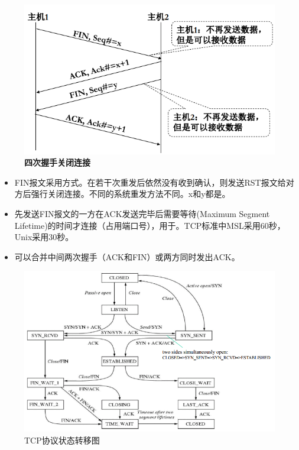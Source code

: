 \myhline
\begin{figure}[H]
    \centering
    \includegraphics[width=0.6\linewidth]{fig/tcp_close.png}
    \caption*{\textbf{四次握手关闭连接}}
\end{figure}
\begin{itemize}
    \item FIN报文采用方式。在若干次重发后依然没有收到确认，则发送RST报文给对方后强行关闭连接。不同的系统重发方法不同。x和y都是。
    \item 先发送FIN报文的一方在ACK发送完毕后需要等待(Maximum Segment Lifetime)的时间才连接（占用端口号），用于。TCP标准中MSL采用60秒，Unix采用30秒。
    \item 可以合并中间两次握手（ACK和FIN）或两方同时发出ACK。
\end{itemize}

\myhline
\begin{figure}[H]
    \centering
    \includegraphics[width=0.8\linewidth]{fig/TCP-transition.PNG}
    \caption*{TCP协议状态转移图}
\end{figure}

